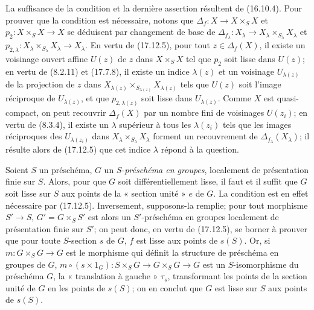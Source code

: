 La suffisance de la condition et la dernière assertion résultent de (16.10.4). Pour prouver que la condition est nécessaire, notons que $\Delta_f:X\to X\times_SX$ et $p_2:X\times_SX\to X$ se déduisent par changement de base de $\Delta_{f_\lambda}:X_\lambda\to X_\lambda\times_{S_\lambda}X_\lambda$ et $p_{2,\lambda}:X_\lambda\times_{S_\lambda}X_\lambda\to X_\lambda$. En vertu de (17.12.5), pour tout $z\in\Delta_f(X)$, il existe un voisinage ouvert affine $U(z)$ de $z$ dans $X\times_SX$ tel que $p_2$ soit lisse dans $U(z)$; en vertu de (8.2.11) et (17.7.8), il existe un indice $\lambda(z)$ et un voisinage $U_{\lambda(z)}$ de la projection de $z$ dans $X_{\lambda(z)}\times_{S_{\lambda(z)}}X_{\lambda(z)}$ tels que $U(z)$ soit l'image réciproque de $U_{\lambda(z)}$, et que $p_{2,\lambda(z)}$ soit lisse dans $U_{\lambda(z)}$. Comme $X$ est quasi-compact, on peut recouvrir $\Delta_f(X)$ par un nombre fini de voisinages $U(z_i)$; en vertu de (8.3.4), il existe un $\lambda$ supérieur à tous les $\lambda(z_i)$ tels que les images réciproques des $U_{\lambda(z_i)}$ dans $X_\lambda\times_{S_\lambda}X_\lambda$ forment un recouvrement de $\Delta_{f_\lambda}(X_\lambda)$; il résulte alors de (17.12.5) que cet indice $\lambda$ répond à la question.

\begin{example}[17.12.7]
\label{IV.17.12.7}
Soient $S$ un préschéma, $G$ un $S$-\emph{préschéma en groupes}, localement de présentation finie sur $S$. Alors, pour que $G$ soit différentiellement lisse, il faut et il suffit que $G$ soit lisse sur $S$ aux points de la « section unité » $e$ de $G$. La condition est en effet nécessaire par (17.12.5). Inversement, supposons-la remplie; pour tout morphisme $S'\to S$, $G'=G\times_SS'$ est alors un $S'$-préschéma en groupes localement de présentation finie sur $S'$; on peut donc, en vertu de (17.12.5), se borner à prouver que pour toute $S$-section $s$ de $G$, $f$ est lisse aux points de $s(S)$. Or, si $m:G\times_SG\to G$ est le morphisme qui définit la structure de préschéma en groupes de $G$, $m\circ(s\times1_G):S\times_SG\to G\times_SG\to G$ est un
$S$-isomorphisme du préschéma $G$, la « translation à gauche » $\tau_s$, transformant les points de la section unité de $G$ en les points de $s(S)$; on en conclut que $G$ est lisse sur $S$ aux points de $s(S)$.
\end{example}

